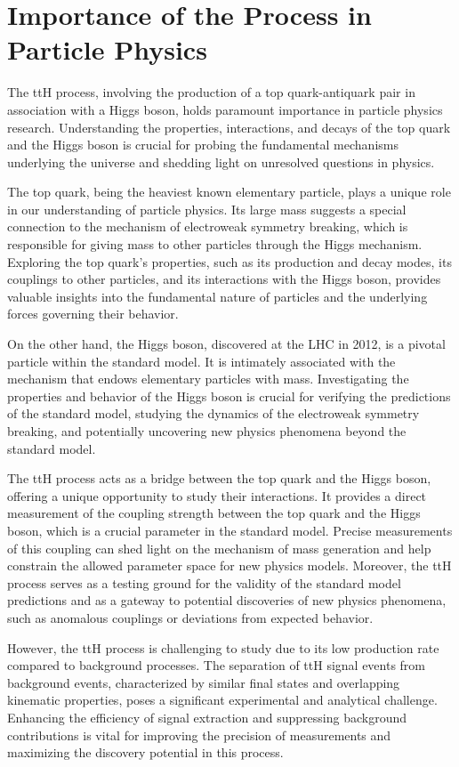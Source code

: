 \section*{Importance of the \ttH Process in Particle Physics}

The ttH process, involving the production of a top quark-antiquark pair in association with a Higgs boson, holds
paramount importance in particle physics research. Understanding the properties, interactions, and decays of the top
quark and the Higgs boson is crucial for probing the fundamental mechanisms underlying the universe and shedding light
on unresolved questions in physics.

The top quark, being the heaviest known elementary particle, plays a unique role in our understanding of particle
physics. Its large mass suggests a special connection to the mechanism of electroweak symmetry breaking, which is
responsible for giving mass to other particles through the Higgs mechanism. Exploring the top quark's properties, such
as its production and decay modes, its couplings to other particles, and its interactions with the Higgs boson, provides
valuable insights into the fundamental nature of particles and the underlying forces governing their behavior.

On the other hand, the Higgs boson, discovered at the LHC in 2012, is a pivotal particle within the standard model. It
is intimately associated with the mechanism that endows elementary particles with mass. Investigating the properties and
behavior of the Higgs boson is crucial for verifying the predictions of the standard model, studying the dynamics of the
electroweak symmetry breaking, and potentially uncovering new physics phenomena beyond the standard model.

The ttH process acts as a bridge between the top quark and the Higgs boson, offering a unique opportunity to study their
interactions. It provides a direct measurement of the coupling strength between the top quark and the Higgs boson, which
is a crucial parameter in the standard model. Precise measurements of this coupling can shed light on the mechanism of
mass generation and help constrain the allowed parameter space for new physics models. Moreover, the ttH process serves
as a testing ground for the validity of the standard model predictions and as a gateway to potential discoveries of new
physics phenomena, such as anomalous couplings or deviations from expected behavior.

However, the ttH process is challenging to study due to its low production rate compared to background processes. The
separation of ttH signal events from background events, characterized by similar final states and overlapping kinematic
properties, poses a significant experimental and analytical challenge. Enhancing the efficiency of signal extraction and
suppressing background contributions is vital for improving the precision of measurements and maximizing the discovery
potential in this process.

